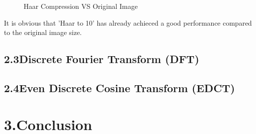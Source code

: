 \documentclass[12pt]{article}
\begin{document}
\begin{figure}[H]
    \centering
    \caption{Haar Compression VS Original Image}
    \label{ref_label_overall}
\end{figure}
\begin{flushleft}
It is obvious that 'Haar to 10' has already achieced a good performance compared to the original image size.
\end{flushleft}
\subsection*{2.3\quad Discrete Fourier Transform (DFT)}


\subsection*{2.4\quad Even Discrete Cosine Transform (EDCT)}




\section*{3.\quad Conclusion}
\end{document}
